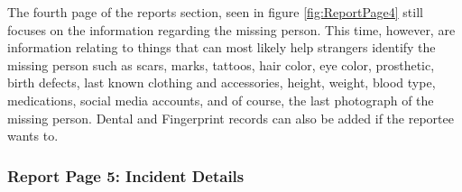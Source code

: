 The fourth page of the reports section, seen in figure \ref{fig:ReportPage4} still focuses on the information regarding the missing person. This time, however, are information relating to things that can most likely help strangers identify the missing person such as scars, marks, tattoos, hair color, eye color, prosthetic, birth defects, last known clothing and accessories, height, weight, blood type, medications, social media accounts, and of course, the last photograph of the missing person. Dental and Fingerprint records can also be added if the reportee wants to.

\subsubsection{Report Page 5: Incident Details}

\begin{figure}[!h]
    \centering
    \begin{subfigure}[c]{0.30\linewidth}
        \centering

\end{subfigure}
\end{figure}
